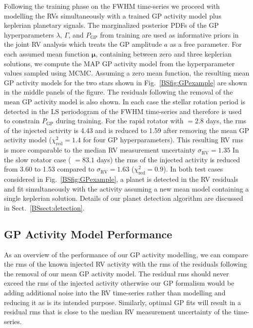 Following the training phase on the FWHM time-series
we proceed with modelling the RVs simultaneously with a trained GP activity model plus keplerian planetary
signals. The marginalized posterior PDFs of the GP hyperparameters $\lambda$, $\Gamma$, and $P_{\text{GP}}$
from training are used as informative priors in the joint RV analysis which treats the GP amplitude
$a$ as a free parameter. For each assumed mean function $\boldsymbol{\mu}$, containing between zero and three
keplerian solutions, we compute the MAP GP activity model from the hyperparameter values sampled using MCMC.
Assuming a zero mean function, the resulting mean GP activity models
for the two stars shown in Fig.~\ref{BSfig:GPexample} are shown in the middle panels of the figure. The residuals
following the removal of the mean GP activity model is also shown. In each case the stellar rotation period is
detected in the LS periodogram of the FWHM time-series and therefore is used to constrain $P_{\text{GP}}$ during
training. For the rapid rotator with \prot{} $=2.8$ days, the rms of the injected activity is 4.43 \mps{} and
is reduced to 1.59 \mps{} after removing the mean GP activity model ($\chi_{\text{red}}^2 =1.4$ for four GP hyperparameters).
This resulting RV rms is more comparable
to the median RV measurement uncertainty $\sigma_{\text{RV}}=1.35$  In the slow rotator case (\prot{} $=83.1$ days)
the rms of the injected activity is reduced from 3.60 \mps{} to 1.53 \mps{} compared to
$\sigma_{\text{RV}}=1.63$ \mps{} ($\chi_{\text{red}}^2 =0.9$). In both test cases considered in
Fig.~\ref{BSfig:GPexample}, a planet is detected in the RV residuals and fit simultaneously with the activity assuming
a new mean model containing a single keplerian solution. Details of our planet detection algorithm are discussed in
Sect.~\ref{BSsect:detection}.


\subsection{GP Activity Model Performance}
As an overview of the performance of our GP activity modelling, we can compare the rms of the known
injected RV activity with the rms of the residuals following the removal of our mean GP activity model. The residual
rms should never exceed the rms of the injected activity otherwise our GP formalism would be adding additional noise
into the RV time-series rather than modelling and reducing it as is its intended purpose. Similarly, optimal GP fits
will result in a residual rms that is close to the median RV measurement uncertainty of the time-series.

